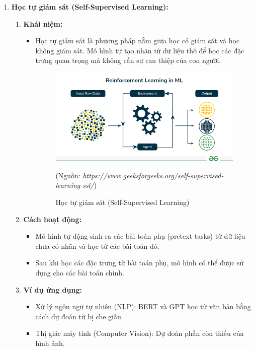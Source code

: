 \documentclass[13pt]{article}
\begin{document}
\begin{enumerate}
    \item \textbf{Học tự giám sát (Self-Supervised Learning): }
    \begin{enumerate}
        \item \textbf{Khái niệm:}
        \begin{itemize}
            \item Học tự giám sát là phương pháp nằm giữa học có giám sát và học không giám sát. Mô hình tự tạo nhãn từ dữ liệu thô để học các đặc trưng quan trọng mà không cần sự can thiệp của con người.

    \begin{figure}[h!]
        \centering        \includegraphics[width=0.7\linewidth]{image/h8.png}
            \caption{Học tự giám sát (Self-Supervised Learning)}
            \label{fig:label1}
            (Nguồn: \textit{https://www.geeksforgeeks.org/self-supervised-learning-ssl/})
    \end{figure} 
        \end{itemize}

        \item \textbf{Cách hoạt động:}
        \begin{itemize}
            \item Mô hình tự động sinh ra các bài toán phụ (pretext tasks) từ dữ liệu chưa có nhãn và học từ các bài toán đó.
            \item Sau khi học các đặc trưng từ bài toán phụ, mô hình có thể được sử dụng cho các bài toán chính.
        \end{itemize}
    
        \item \textbf{Ví dụ ứng dụng: }
        \begin{itemize}
            \item Xử lý ngôn ngữ tự nhiên (NLP): BERT và GPT học từ văn bản bằng cách dự đoán từ bị che giấu.
            \item Thị giác máy tính (Computer Vision): Dự đoán phần còn thiếu của hình ảnh.
        \end{itemize}


\end{enumerate}
\end{enumerate}
\end{document}
